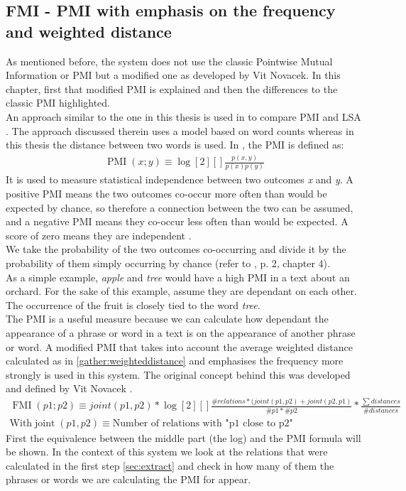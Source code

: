 \subsection{FMI - PMI with emphasis on the frequency and weighted distance}
\label{sec:fmi}
As mentioned before, the system does not use the classic Pointwise Mutual Information or PMI but a modified one as developed by Vit Novacek. In this chapter, first that modified PMI is explained and then the differences to the classic PMI highlighted. \\
An approach similar to the one in this thesis is used in \cite{recchia2009more} to compare PMI and LSA \cite{landauer2006latent}. The approach discussed therein uses a model based on word counts whereas in this thesis the distance between two words is used.
In \cite{church1990word}, the PMI is defined as:\\
\begin{gather}
\label{formula:pmi}
    \operatorname{PMI}(x;y) \equiv \log[2][]{\frac{p(x,y)}{p(x)p(y)}}
\end{gather}
It is used to measure statistical independence between two outcomes \textit{x} and \textit{y}. A positive PMI means the two outcomes co-occur more often than would be expected by chance, so therefore a connection between the two can be assumed, and a negative PMI means they co-occur less often than would be expected. A score of zero means they are independent \cite{bouma2009normalized}.\\
We take the probability of the two outcomes co-occurring and divide it by the probability of them simply occurring by chance (refer to \cite{church1990word}, p. 2, chapter 4).\\
As a simple example, \textit{apple} and \textit{tree} would have a high PMI in a text about an orchard. For the sake of this example, assume they are dependant on each other. The occurrence of the fruit is closely tied to the word \textit{tree}.\\
The PMI is a useful measure because we can calculate how dependant the appearance of a phrase or word in a text is on the appearance of another phrase or word. A modified PMI that takes into account the average weighted distance calculated as in \ref{gather:weighteddistance} and emphasises the frequency more strongly is used in this system. The original concept behind this was developed and defined by Vit Novacek \cite{novavcek2014skimmr}.\\
\begin{gather}
\label{formula:fmi}
  \operatorname{FMI}(p1;p2) \equiv joint(p1, p2) *
    \log[2][]{\frac{\#relations * (joint(p1, p2) + joint(p2, p1)}{\#p1 * \#p2}} * \frac{\sum{}{distances}}{\#distances}\\
    \text{With} \operatorname{joint}(p1, p2) \equiv \text{Number of relations with "p1 close to p2"}
\end{gather}
First the equivalence between the middle part (the log) and the PMI formula will be shown. In the context of this system we look at the relations that were calculated in the first step \ref{sec:extract} and check in how many of them the phrases or words we are calculating the PMI for appear.

